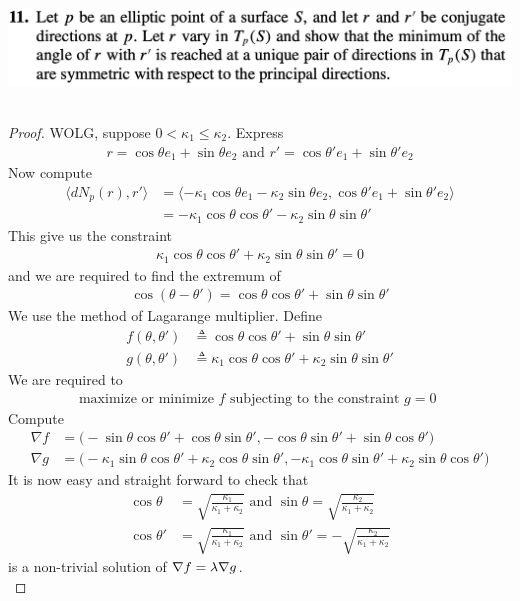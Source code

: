 \documentclass{report}
\begin{document}
\begin{question}{}{}
\includegraphics[height=3cm,width=18cm]{hw5q5}
\end{question}
\begin{proof}
WOLG, suppose $0<\kappa_1 \leq \kappa_2$. Express 
\begin{align*}
r=\cos \theta e_1+ \sin \theta e_2\text{ and }r'=\cos \theta' e_1+ \sin \theta' e_2
\end{align*}
Now compute 
\begin{align*}
\langle dN_p(r),r'\rangle &= \langle -\kappa_1 \cos \theta e_1- \kappa_2 \sin \theta e_2, \cos \theta ' e_1+ \sin \theta' e_2 \rangle \\
&=- \kappa_1 \cos \theta \cos \theta '- \kappa_2 \sin \theta \sin \theta'
\end{align*}
This give us the constraint
\begin{align*}
\kappa_1 \cos \theta \cos \theta' + \kappa_2 \sin \theta \sin \theta ' =0 \end{align*}
and we are required to find the extremum of 
\begin{align*}
\cos (\theta - \theta ' )=\cos \theta \cos \theta'+\sin \theta \sin \theta' 
\end{align*}
We use the method of Lagarange multiplier. Define 
\begin{align*}
  f(\theta ,\theta')&\triangleq \cos \theta \cos \theta ' + \sin \theta \sin \theta'\\
g(\theta, \theta')&\triangleq  \kappa_1 \cos \theta \cos \theta' + \kappa_2 \sin \theta \sin \theta' 
\end{align*}
We are required to 
\begin{align*}
\text{ maximize or minimize $f$ subjecting to the constraint $g=0$ }
\end{align*}
Compute 
\begin{align*}
\nabla f&= \Big(-\sin \theta \cos \theta' + \cos \theta \sin \theta' , - \cos \theta \sin \theta' + \sin \theta \cos \theta' \Big)\\
\nabla g&=\Big(-\kappa_1 \sin \theta \cos \theta' + \kappa_2 \cos \theta \sin \theta' , -\kappa_1 \cos \theta \sin \theta' + \kappa_2 \sin \theta \cos \theta' \Big)
\end{align*}
It is now easy and straight forward to check that 
\begin{align*}
\cos \theta&= \sqrt{\frac{\kappa_1}{\kappa_1 +\kappa_2}}\text{ and }\sin \theta = \sqrt{\frac{\kappa_2}{\kappa_1+ \kappa_2}} \\
\cos \theta'&= \sqrt{\frac{\kappa_1}{\kappa_1 +\kappa_2}}\text{ and }\sin \theta'= - \sqrt{\frac{\kappa_2}{\kappa_1+\kappa_2}} 
\end{align*}
is a non-trivial solution of $\nabla f=\lambda \nabla g$. \\


\end{proof}
\end{document}

